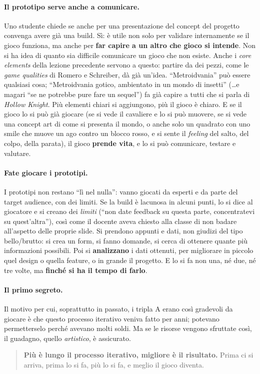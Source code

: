 \paragraph{Il prototipo serve anche a comunicare.} Uno studente chiede se
anche per una presentazione del concept del progetto convenga avere già una
build. Sì: è utile non solo per validare internamente se il gioco funziona, ma
anche per \textbf{far capire a un altro che gioco si intende}. Non si ha idea
di quanto sia difficile comunicare un gioco che non esiste. Anche i
\emph{core elements} della lezione precedente servono a questo: partire da dei
pezzi, come le \emph{game qualities} di Romero e Schreiber, dà già un'idea.
``Metroidvania'' può essere qualsiasi cosa; ``Metroidvania gotico, ambientato
in un mondo di insetti'' (\dots e magari ``se ne potrebbe pure fare un
sequel'') fa già capire a tutti che si parla di \emph{Hollow Knight}. Più
elementi chiari si aggiungono, più il gioco è chiaro. E se il gioco lo si può
già giocare (se si vede il cavaliere e lo si può muovere, se si vede una
concept art di come si presenta il mondo, o anche solo un quadrato con uno
smile che muove un ago contro un blocco rosso, e si sente il \emph{feeling}
del salto, del colpo, della parata), il gioco \textbf{prende vita}, e lo si
può comunicare, testare e valutare.

\paragraph{Fate giocare i prototipi.} I prototipi non restano ``lì nel
nulla'': vanno giocati da esperti e da parte del target audience, con dei
limiti. Se la build è lacunosa in alcuni punti, lo si dice al giocatore e si
creano dei \emph{limiti} (``non date feedback su questa parte, concentratevi
su quest'altra''), così come il docente aveva chiesto alla classe di non
badare all'aspetto delle proprie slide. Si prendono appunti e dati, non
giudizi del tipo bello/brutto: si crea un form, si fanno domande, si cerca di
ottenere quante più informazioni possibili. Poi si \textbf{analizzano} i dati
ottenuti, per migliorare in piccolo quel design o quella feature, o in grande
il progetto. E lo si fa non una, né due, né tre volte, ma \textbf{finché si ha
il tempo di farlo}.

\paragraph{Il primo segreto.} Il motivo per cui, soprattutto in passato, i
tripla A erano così gradevoli da giocare è che questo processo iterativo
veniva fatto per anni; potevano permetterselo perché avevano molti soldi. Ma
se le risorse vengono sfruttate così, il guadagno, quello \emph{artistico}, è
assicurato.
\begin{quote}
\centering
\textbf{Più è lungo il processo iterativo, migliore è il risultato.} Prima ci
si arriva, prima lo si fa, più lo si fa, e meglio il gioco diventa.
\end{quote}

